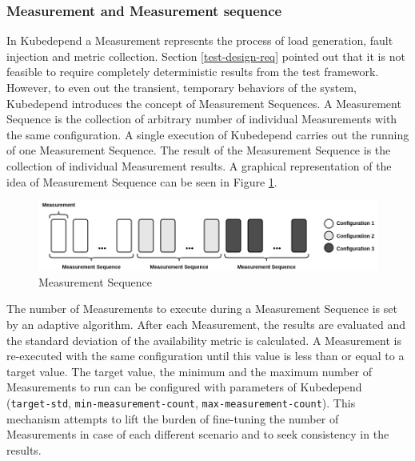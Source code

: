 \subsubsection{Measurement and Measurement sequence} \label{test-impl-measurement-seq}

In Kubedepend a Measurement represents the process of load generation, fault injection and metric collection. Section \ref{test-design-req} pointed out that it is not feasible to require completely deterministic results from the test framework. However, to even out the transient, temporary behaviors of the system, Kubedepend introduces the concept of Measurement Sequences. A Measurement Sequence is the collection of arbitrary number of individual Measurements with the same configuration. A single execution of Kubedepend carries out the running of one Measurement Sequence. The result of the Measurement Sequence is the collection of individual Measurement results. A graphical representation of the idea of Measurement Sequence can be seen in Figure \ref{fig:measurement_sequence}.

\begin{figure}[h]
	\centering
	\includegraphics[width=140mm, keepaspectratio]{figures/measurement_sequence.png}
	\caption{Measurement Sequence}
	\label{fig:measurement_sequence}
\end{figure}

The number of Measurements to execute during a Measurement Sequence is set by an adaptive algorithm. After each Measurement, the results are evaluated and the standard deviation of the availability metric is calculated. A Measurement is re-executed with the same configuration until this value is less than or equal to a target value. The target value, the minimum and the maximum number of Measurements to run can be configured with parameters of Kubedepend (\texttt{target-std}, \texttt{min-measurement-count}, \texttt{max-measurement-count}). This mechanism attempts to lift the burden of fine-tuning the number of Measurements in case of each different scenario and to seek consistency in the results.


